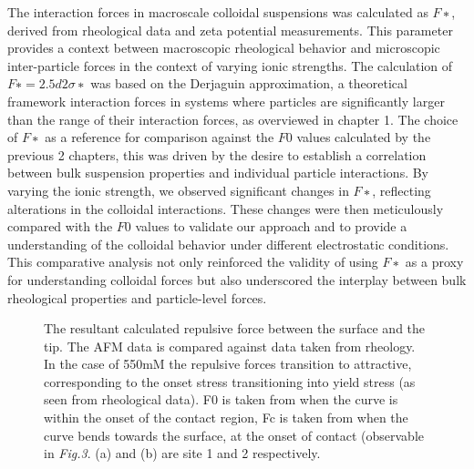 The interaction forces in macroscale colloidal suspensions was calculated as $F∗$, derived from rheological data and zeta potential measurements. This parameter provides a context between macroscopic rheological behavior and microscopic inter-particle forces in the context of varying ionic strengths. The calculation of $F∗=2.5d2σ∗$ was based on the Derjaguin approximation, a theoretical framework interaction forces in systems where particles are significantly larger than the range of their interaction forces, as overviewed in chapter 1. The choice of $F∗$ as a reference for comparison against the $F0$ values calculated by the previous 2 chapters, this was driven by the desire to establish a correlation between bulk suspension properties and individual particle interactions. By varying the ionic strength, we observed significant changes in $F∗$, reflecting alterations in the colloidal interactions. These changes were then meticulously compared with the $F0$ values to validate our approach and to provide a understanding of the colloidal behavior under different electrostatic conditions. This comparative analysis not only reinforced the validity of using $F∗$ as a proxy for understanding colloidal forces but also underscored the interplay between bulk rheological properties and particle-level forces.

\begin{figure}[!tbph!!!]
  \centering
  \hfill
  \caption{The resultant calculated repulsive force between the surface and the tip. The AFM data is compared against data taken from rheology. In the case of 550mM the repulsive forces transition to attractive, corresponding to the onset stress transitioning into yield stress (as seen from rheological data). F0 is taken from when the curve is within the onset of the contact region, Fc is taken from when the curve bends towards the surface, at the onset of contact (observable in \textit{Fig.3}. (a) and (b) are site 1 and 2 respectively\cite{John}.}
\end{figure}

